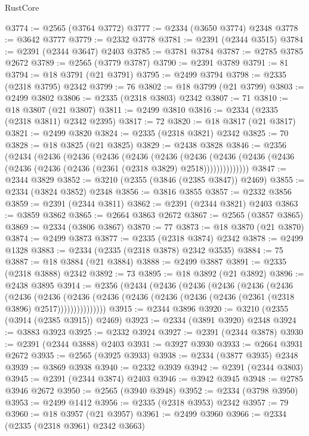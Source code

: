 \begin{lexlean}{RustCore}
\begin{coremodule}
@3774 := @2565 (@3764 @3772)
@3777 := @2334 (@3650 @3774) @2348
@3778 := @3642 @3777
@3779 := @2332 @3778
@3781 := @2391 (@2344 @3515)
@3784 := @2391 (@2344 @3647) @2403
@3785 := @3781 @3784
@3787 := @2785 @3785 @2672
@3789 := @2565 (@3779 @3787)
@3790 := @2391 @3789
@3791 := 81
@3794 := @18 @3791 (@21 @3791)
@3795 := @2499 @3794
@3798 := @2335 (@2318 @3795) @2342
@3799 := 76
@3802 := @18 @3799 (@21 @3799)
@3803 := @2499 @3802
@3806 := @2335 (@2318 @3803) @2342
@3807 := 71
@3810 := @18 @3807 (@21 @3807)
@3811 := @2499 @3810
@3816 := @2334 (@2335 (@2318 @3811) @2342 @2395)
@3817 := 72
@3820 := @18 @3817 (@21 @3817)
@3821 := @2499 @3820
@3824 := @2335 (@2318 @3821) @2342
@3825 := 70
@3828 := @18 @3825 (@21 @3825)
@3829 := @2438 @3828
@3846 := @2356
    (@2434
      (@2436
        (@2436
          (@2436
            (@2436
              (@2436
                (@2436
                  (@2436 (@2436 (@2436 (@2436 (@2436 (@2436 (@2361 (@2318 @3829) @2518))))))))))))))
@3847 := @2344 @3829
@3852 := @3210 (@2355 (@3846 (@2385 @3847)) @2469)
@3855 := @2334 (@3824 @3852) @2348
@3856 := @3816 @3855
@3857 := @2332 @3856
@3859 := @2391 (@2344 @3811)
@3862 := @2391 (@2344 @3821) @2403
@3863 := @3859 @3862
@3865 := @2664 @3863 @2672
@3867 := @2565 (@3857 @3865)
@3869 := @2334 (@3806 @3867)
@3870 := 77
@3873 := @18 @3870 (@21 @3870)
@3874 := @2499 @3873
@3877 := @2335 (@2318 @3874) @2342
@3878 := @2499 @1328
@3883 := @2334 (@2335 (@2318 @3878) @2342 @3535)
@3884 := 75
@3887 := @18 @3884 (@21 @3884)
@3888 := @2499 @3887
@3891 := @2335 (@2318 @3888) @2342
@3892 := 73
@3895 := @18 @3892 (@21 @3892)
@3896 := @2438 @3895
@3914 := @2356
    (@2434
      (@2436
        (@2436
          (@2436
            (@2436
              (@2436
                (@2436
                  (@2436
                    (@2436
                      (@2436 (@2436 (@2436 (@2436 (@2436 (@2361 (@2318 @3896) @2517)))))))))))))))
@3915 := @2344 @3896
@3920 := @3210 (@2355 (@3914 (@2385 @3915)) @2469)
@3923 := @2334 (@3891 @3920) @2348
@3924 := @3883 @3923
@3925 := @2332 @3924
@3927 := @2391 (@2344 @3878)
@3930 := @2391 (@2344 @3888) @2403
@3931 := @3927 @3930
@3933 := @2664 @3931 @2672
@3935 := @2565 (@3925 @3933)
@3938 := @2334 (@3877 @3935) @2348
@3939 := @3869 @3938
@3940 := @2332 @3939
@3942 := @2391 (@2344 @3803)
@3945 := @2391 (@2344 @3874) @2403
@3946 := @3942 @3945
@3948 := @2785 @3946 @2672
@3950 := @2565 (@3940 @3948)
@3952 := @2334 (@3798 @3950)
@3953 := @2499 @1412
@3956 := @2335 (@2318 @3953) @2342
@3957 := 79
@3960 := @18 @3957 (@21 @3957)
@3961 := @2499 @3960
@3966 := @2334 (@2335 (@2318 @3961) @2342 @3663)

\end{coremodule}
\end{lexlean}
